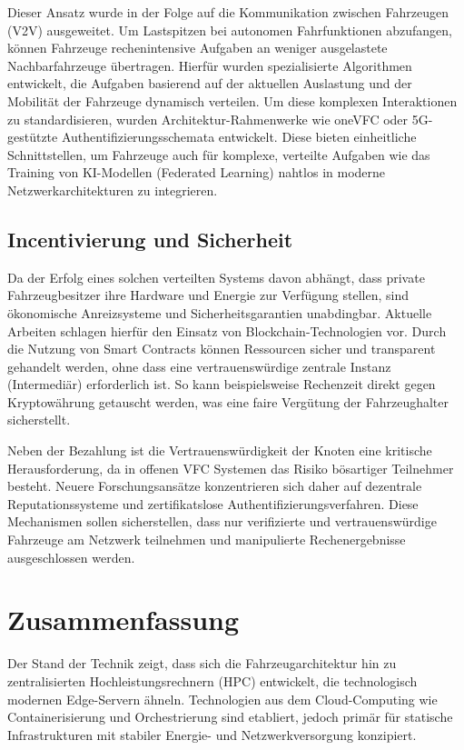 Dieser Ansatz wurde in der Folge auf die Kommunikation zwischen Fahrzeugen (\gls{V2V}) ausgeweitet. Um Lastspitzen bei autonomen Fahrfunktionen abzufangen, können Fahrzeuge rechenintensive Aufgaben an weniger ausgelastete Nachbarfahrzeuge übertragen. Hierfür wurden spezialisierte Algorithmen entwickelt, die Aufgaben basierend auf der aktuellen Auslastung und der Mobilität der Fahrzeuge dynamisch verteilen. \cite{Liao2019} \cite{Wu2020} Um diese komplexen Interaktionen zu standardisieren, wurden Architektur-Rahmenwerke wie oneVFC oder 5G-gestützte Authentifizierungsschemata entwickelt. Diese bieten einheitliche Schnittstellen, um Fahrzeuge auch für komplexe, verteilte Aufgaben wie das Training von KI-Modellen (Federated Learning) nahtlos in moderne Netzwerkarchitekturen zu integrieren. \cite{Phung2021} \cite{Almazroi2023}

\subsection{Incentivierung und Sicherheit}

Da der Erfolg eines solchen verteilten Systems davon abhängt, dass private Fahrzeugbesitzer ihre Hardware und Energie zur Verfügung stellen, sind ökonomische Anreizsysteme und Sicherheitsgarantien unabdingbar. Aktuelle Arbeiten schlagen hierfür den Einsatz von Blockchain-Technologien vor. Durch die Nutzung von Smart Contracts können Ressourcen sicher und transparent gehandelt werden, ohne dass eine vertrauenswürdige zentrale Instanz (Intermediär) erforderlich ist. So kann beispielsweise Rechenzeit direkt gegen Kryptowährung getauscht werden, was eine faire Vergütung der Fahrzeughalter sicherstellt. \cite{Liao2021} \cite{Zhao2020}

Neben der Bezahlung ist die Vertrauenswürdigkeit der Knoten eine kritische Herausforderung, da in offenen \gls{VFC} Systemen das Risiko bösartiger Teilnehmer besteht. Neuere Forschungsansätze konzentrieren sich daher auf dezentrale Reputationssysteme und zertifikatslose Authentifizierungsverfahren. Diese Mechanismen sollen sicherstellen, dass nur verifizierte und vertrauenswürdige Fahrzeuge am Netzwerk teilnehmen und manipulierte Rechenergebnisse ausgeschlossen werden. \cite{Almazroi2023} \cite{Nourani2023}

\section{Zusammenfassung}

Der Stand der Technik zeigt, dass sich die Fahrzeugarchitektur hin zu zentralisierten Hochleistungsrechnern (HPC) entwickelt, die technologisch modernen Edge-Servern ähneln. Technologien aus dem Cloud-Computing wie Containerisierung und Orchestrierung sind etabliert, jedoch primär für statische Infrastrukturen mit stabiler Energie- und Netzwerkversorgung konzipiert.

